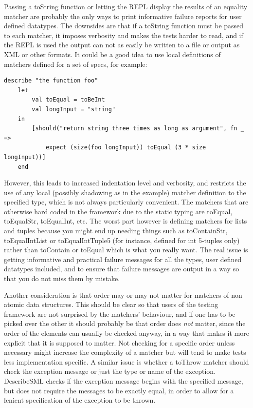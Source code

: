 \documentclass[11pt]{article}
\begin{document}
Passing a toString function or letting the REPL display the results of an equality \gls{matcher} are probably the only ways to print informative failure reports for user defined datatypes. The downsides are that if a toString function must be passed to each \gls{matcher}, it imposes verbosity and makes the tests harder to read, and if the REPL is used the output can not as easily be written to a file or output as XML or other formats. It could be a good idea to use local definitions of \glspl{matcher} defined for a set of specs, for example:

\begin{verbatim}
describe "the function foo"
    let
        val toEqual = toBeInt
        val longInput = "string"
    in
        [should("return string three times as long as argument", fn _ =>
            expect (size(foo longInput)) toEqual (3 * size longInput))]
    end
\end{verbatim}

However, this leads to increased indentation level and verbosity, and restricts the use of any local (possibly shadowing as in the example) \gls{matcher} definition to the specified type, which is not always particularly convenient. The matchers that are otherwise hard coded in the framework due to the static typing are toEqual, toEqualStr, toEqualInt, etc. The worst part however is defining matchers for lists and tuples because you might end up needing things such as toContainStr, toEqualIntList or toEqualIntTuple5 (for instance, defined for int 5-tuples only) rather than toContain or toEqual which is what you really want. The real issue is getting informative and practical failure messages for all the types, user defined datatypes included, and to ensure that failure messages are output in a way so that you do not miss them by mistake.

Another consideration is that order may or may not matter for matchers of non-atomic data structures. This should be clear so that users of the testing framework are not surprised by the matchers' behaviour, and if one has to be picked over the other it should probably be that order does \emph{not} matter, since the order of the elements can usually be checked anyway, in a way that makes it more explicit that it is supposed to matter. Not checking for a specific order unless necessary might increase the complexity of a matcher but will tend to make tests less implementation specific. A similar issue is whether a toThrow matcher should check the exception message or just the type or name of the exception. DescribeSML checks if the exception message begins with the specified message, but does not require the messages to be exactly equal, in order to allow for a lenient specification of the exception to be thrown.
\end{document}

